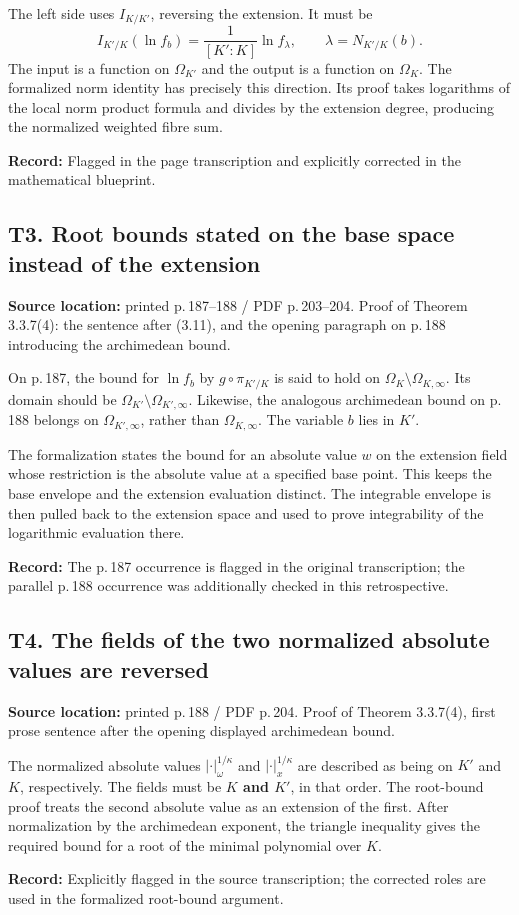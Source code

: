 \documentclass[10pt,a4paper]{article}
\newcommand{\loc}[2]{\textbf{Source location:} printed p.\,#1 / PDF p.\,#2.}
\newcommand{\hist}[1]{\par{\footnotesize\color{graytext}\textbf{Record:} #1}}
\begin{document}
The left side uses $I_{K/K'}$, reversing the extension. It must be
\[
 I_{K'/K}(\ln f_b)=\frac{1}{[K':K]}\ln f_\lambda,
 \qquad \lambda=N_{K'/K}(b).
\]
The input is a function on $\Omega_{K'}$ and the output is a function on
$\Omega_K$. The formalized norm identity has precisely this direction.
Its proof takes logarithms of the local norm product formula and divides
by the extension degree, producing the normalized weighted fibre sum.
\hist{Flagged in the page transcription and explicitly corrected in the
mathematical blueprint.}

\subsection{T3. Root bounds stated on the base space instead of the extension}
\loc{187--188}{203--204} Proof of Theorem 3.3.7(4): the sentence after
(3.11), and the opening paragraph on p.\,188 introducing the archimedean bound.

On p.\,187, the bound for $\ln f_b$ by $g\circ\pi_{K'/K}$ is said to
hold on $\Omega_K\setminus\Omega_{K,\infty}$. Its domain should be
$\Omega_{K'}\setminus\Omega_{K',\infty}$. Likewise, the analogous
archimedean bound on p.\,188 belongs on $\Omega_{K',\infty}$, rather
than $\Omega_{K,\infty}$. The variable $b$ lies in $K'$.

The formalization states the bound for an absolute value $w$ on the extension field
whose restriction is the absolute value at a specified base point.
This keeps the base envelope and the extension evaluation distinct.
The integrable envelope is then pulled back to the extension space and
used to prove integrability of the logarithmic evaluation there.
\hist{The p.\,187 occurrence is flagged in the original transcription;
the parallel p.\,188 occurrence was additionally checked in this retrospective.}

\subsection{T4. The fields of the two normalized absolute values are reversed}
\loc{188}{204} Proof of Theorem 3.3.7(4), first prose sentence after
the opening displayed archimedean bound.

The normalized absolute values $|\cdot|_\omega^{1/\kappa}$ and
$|\cdot|_x^{1/\kappa}$ are described as being on $K'$ and $K$,
respectively. The fields must be \textbf{$K$ and $K'$}, in that order.
The root-bound proof treats the second absolute value as an extension
of the first. After normalization by the archimedean exponent, the
triangle inequality gives the required bound for a root of the minimal
polynomial over $K$.
\hist{Explicitly flagged in the source transcription; the corrected
roles are used in the formalized root-bound argument.}
\end{document}
